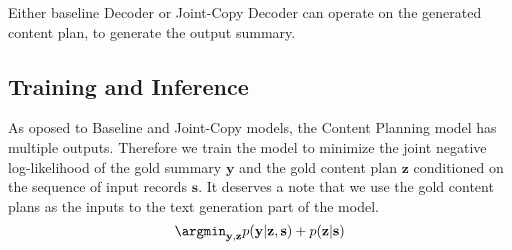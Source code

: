 Either baseline Decoder or Joint-Copy Decoder can operate on the generated content plan, to generate the output summary.

\subsection{Training and Inference}

As oposed to Baseline and Joint-Copy models, the Content Planning model has multiple outputs. Therefore we train the model to minimize the joint negative log-likelihood of the gold summary $\mathbf{y}$ and the gold content plan $\mathbf{z}$ conditioned on the sequence of input records $\mathbf{s}$. It deserves a note that we use the gold content plans as the inputs to the text generation part of the model.
\begin{equation}
    \argmin_{\mathbf{y}, \mathbf{z}}{p(\mathbf{y}|\mathbf{z}, \mathbf{s}) + p(\mathbf{z} | \mathbf{s})}
\end{equation}
